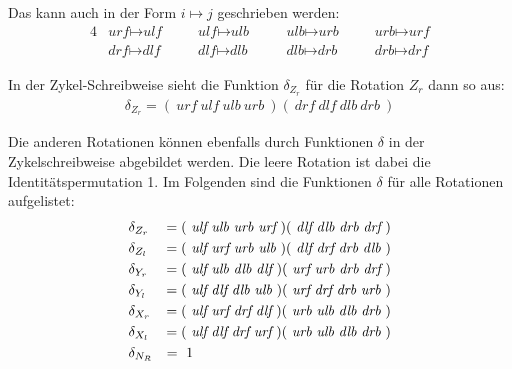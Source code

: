 \documentclass[12pt,a4paper, usenames, dvipsnames]{article}
\theoremstyle{mystyle}
\theoremstyle{definition}
\begin{document}
Das kann auch in der Form $i \mapsto j$ geschrieben werden: 
\begin{alignat*}{4}
& \textit{urf} \mapsto \textit{ulf} \ \ \ \ \ \ \ \ & \textit{ulf} \mapsto \textit{ulb} \ \ \ \ \ \ \ \ & \textit{ulb} \mapsto \textit{urb} \ \ \ \ \ \ \ \ & \textit{urb} \mapsto \textit{urf} \\
& \textit{drf} \mapsto \textit{dlf} \ \ \ \ \ \ \ \ & \textit{dlf} \mapsto \textit{dlb} \ \ \ \ \ \ \ \ \ & \textit{dlb} \mapsto \textit{drb} \ \ \ \ \ \ \ \ & \textit{drb} \mapsto \textit{drf}
\end{alignat*}

In der Zykel-Schreibweise sieht die Funktion $\delta_{Z_r}$ für die Rotation $Z_r$ dann so aus:
\begin{align*}
\delta_{Z_r}=( \ \textit{urf} \ \textit{ulf} \ \textit{ulb} \ \textit{urb} \ )( \ \textit{drf} \ \textit{dlf} \ \textit{dlb} \ \textit{drb} \  )
\end{align*}
 

Die anderen Rotationen können ebenfalls durch Funktionen $\delta$ in der Zykelschreibweise abgebildet werden. Die leere Rotation ist dabei die Identitätspermutation 1. Im Folgenden sind die Funktionen $\delta$ für alle Rotationen aufgelistet:
\begin{alignat*}{2}
& \delta_{Z_r} & = ( \ \textit{ulf} \ \textit{ulb} \ \textit{urb} \ \textit{urf}\ )(\ \textit{dlf} \ \textit{dlb} \ \textit{drb} \ \textit{drf} \ )\\
& \delta_{Z_l} & = ( \ \textit{ulf} \ \textit{urf} \ \textit{urb} \ \textit{ulb}\ )(\ \textit{dlf} \ \textit{drf} \ \textit{drb} \ \textit{dlb} \ )\\
& \delta_{Y_r} & = ( \ \textit{ulf} \ \textit{ulb} \ \textit{dlb} \ \textit{dlf}\ )(\ \textit{urf} \ \textit{urb} \ \textit{drb} \ \textit{drf} \ )\\
& \delta_{Y_l} & = ( \ \textit{ulf} \ \textit{dlf} \ \textit{dlb} \ \textit{ulb}\ )(\ \textit{urf} \ \textit{drf} \ \textit{drb} \ \textit{urb} \ )\\
& \delta_{X_r} & = ( \ \textit{ulf} \ \textit{urf} \ \textit{drf} \ \textit{dlf}\ )(\ \textit{urb} \ \textit{ulb} \ \textit{dlb} \ \textit{drb} \ )\\
& \delta_{X_l} & = ( \ \textit{ulf} \ \textit{dlf} \ \textit{drf} \ \textit{urf}\ )(\ \textit{urb} \ \textit{ulb} \ \textit{dlb} \ \textit{drb} \ )\\
& \delta_{N_R} & = \ 1 \hspace*{14.1em}
\end{alignat*}
\end{document}
